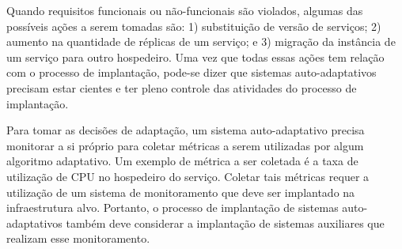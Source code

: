 \begin{description}
Quando requisitos funcionais ou não-funcionais são violados, 
algumas das possíveis ações a serem tomadas são:
1) substituição de versão de serviços; 2) aumento na quantidade de réplicas de um serviço; e
3) migração da instância de um serviço para outro hospedeiro.
Uma vez que todas essas ações tem relação com o processo de implantação,
pode-se dizer que sistemas auto-adaptativos precisam estar cientes
e ter pleno controle das atividades do processo de implantação.

Para tomar as decisões de adaptação, um sistema auto-adaptativo precisa monitorar
a si próprio para coletar métricas a serem utilizadas por algum algoritmo adaptativo.
Um exemplo de métrica a ser coletada é a taxa de utilização de CPU no hospedeiro do serviço.
Coletar tais métricas requer a utilização de um sistema de monitoramento
que deve ser implantado na infraestrutura alvo.
Portanto, o processo de implantação de sistemas auto-adaptativos
também deve considerar a implantação de sistemas auxiliares que realizam esse monitoramento.


\end{description}



